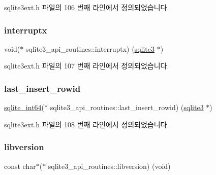 sqlite3ext.\+h 파일의 106 번째 라인에서 정의되었습니다.

\mbox{\label{structsqlite3__api__routines_adab3cdd36976fa72f7e6662f597818ea}} 
\subsubsection{\texorpdfstring{interruptx}{interruptx}}
{\footnotesize\ttfamily void($\ast$ sqlite3\+\_\+api\+\_\+routines\+::interruptx) (\hyperlink{sqlite3_8h_a0ef6f2646262c8a9b24368d8ac140f69}{sqlite3} $\ast$)}



sqlite3ext.\+h 파일의 107 번째 라인에서 정의되었습니다.

\mbox{\label{structsqlite3__api__routines_a6e69f8e7d32673cf778b58d0856e6dc7}} 
\subsubsection{\texorpdfstring{last\+\_\+insert\+\_\+rowid}{last\_insert\_rowid}}
{\footnotesize\ttfamily \hyperlink{sqlite3_8h_a520a95f9080c018b2fade39885bd2e2a}{sqlite\+\_\+int64}($\ast$ sqlite3\+\_\+api\+\_\+routines\+::last\+\_\+insert\+\_\+rowid) (\hyperlink{sqlite3_8h_a0ef6f2646262c8a9b24368d8ac140f69}{sqlite3} $\ast$)}



sqlite3ext.\+h 파일의 108 번째 라인에서 정의되었습니다.

\mbox{\label{structsqlite3__api__routines_ac60b467b55897230bf12dc593ca561e8}} 
\subsubsection{\texorpdfstring{libversion}{libversion}}
{\footnotesize\ttfamily const char$\ast$($\ast$ sqlite3\+\_\+api\+\_\+routines\+::libversion) (void)}



